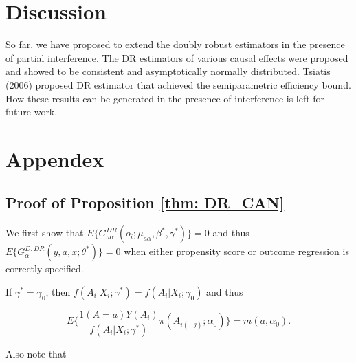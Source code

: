 \documentclass[oupdraft]{biostatistics}
\begin{document}
\vspace{-.3cm}
\section{Discussion}\label{sec: DR_discussion}
\vspace{3mm}

So far, we have proposed to extend the doubly robust estimators in the presence of partial interference. The DR estimators of various causal effects were proposed and showed to be consistent and asymptotically normally distributed. Tsiatis (2006)\nocite{tsiatis2006semiparametric} proposed DR estimator that achieved the semiparametric efficiency bound. How these results can be generated in the presence of interference is left for future work.

\vspace{-.3cm}
\section{Appendex}
\vspace{3mm}

\subsection*{Proof of Proposition \ref{thm: DR_CAN}}

We first show that $E\{G^{DR}_{a\alpha}(o_i;\mu_{a\alpha},\beta^{*},\gamma^{*})\}=0$ and thus $E\{G^{D,DR}_{\alpha}(y,a,x;\theta^{*})\}=0$ when either propensity score or outcome regression is correctly specified.


If $\gamma^{*}=\gamma_0$, then ${f}(A_i|X_i;\gamma^{*})=f(A_i|X_i;\gamma_0)$ and thus


\vspace{-0.4cm}
\begin{equation*}
  E\Biggl\{\frac{1(A=a)Y(A_i)}{{f}(A_i|X_i;\gamma^{*})}\pi(A_{i(-j)};\alpha_0)\Biggr\}=m(a,\alpha_0).
\end{equation*}

\vspace{-0.3cm}
\noindent Also note that
\end{document}
